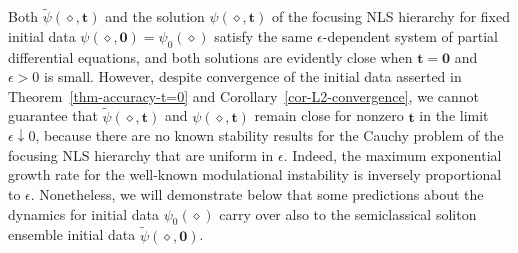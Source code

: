 \documentclass[12pt]{amsart}
\numberwithin{equation}{section}
\newcommand{\eps}{\epsilon}
\begin{document}
\begin{rem} Both $\widetilde{\psi}(\diamond,\mathbf{t})$ and the solution $\psi(\diamond,\mathbf{t})$ of the focusing NLS hierarchy for fixed initial data $\psi(\diamond,\mathbf{0})=\psi_0(\diamond)$ satisfy the same $\epsilon$-dependent system of partial differential equations, and both solutions are evidently close when $\mathbf{t}=\mathbf{0}$ and $\eps>0$ is small.  However, despite convergence of the initial data asserted in Theorem~\ref{thm-accuracy-t=0} and Corollary~\ref{cor-L2-convergence}, we cannot guarantee that $\widetilde{\psi}(\diamond,\mathbf{t})$ and $\psi(\diamond,\mathbf{t})$ remain close for nonzero $\mathbf{t}$ in the limit $\eps\downarrow 0$, because there are no known stability results for the Cauchy problem of the focusing NLS hierarchy that are uniform in $\epsilon$.  Indeed, the maximum exponential growth rate for the well-known modulational instability is inversely proportional to $\eps$.  Nonetheless, we will demonstrate below that some predictions about the dynamics for initial data $\psi_0(\diamond)$ carry over also to the semiclassical soliton ensemble initial data $\widetilde{\psi}(\diamond,\mathbf{0})$.
\label{rem-WatchOut}
\end{rem}
\end{document}
